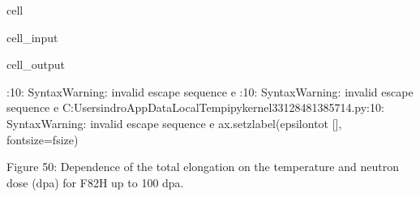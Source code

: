 \documentclass[letterpaper,10pt,english]{jupyterBook}
\begin{document}
\begin{sphinxuseclass}{cell}
\begin{sphinxVerbatimInput}
\begin{sphinxuseclass}{cell_input}
\begin{sphinxVerbatim}[commandchars=\\\{\}]
					 
					 
					\PYG{l+s+s1}{\PYGZdl{} [}\PYG{l+s+s1}{]} 
					 
				\end{sphinxVerbatim}
				
		\end{sphinxuseclass}\end{sphinxVerbatimInput}
		\begin{sphinxVerbatimOutput}
			
			\begin{sphinxuseclass}{cell_output}
				\begin{sphinxVerbatim}[commandchars=\\\{\}]
					\PYGZlt{}\PYGZgt{}:10: SyntaxWarning: invalid escape sequence \PYGZsq{}\PYGZbs{}e\PYGZsq{}
					\PYGZlt{}\PYGZgt{}:10: SyntaxWarning: invalid escape sequence \PYGZsq{}\PYGZbs{}e\PYGZsq{}
					C:\PYGZbs{}Users\PYGZbs{}indro\PYGZbs{}AppData\PYGZbs{}Local\PYGZbs{}Temp\PYGZbs{}ipykernel\PYGZus{}33128\PYGZbs{}481385714.py:10: SyntaxWarning: invalid escape sequence \PYGZsq{}\PYGZbs{}e\PYGZsq{}
					ax.set\PYGZus{}zlabel(\PYGZsq{}\PYGZdl{}\PYGZbs{}epsilon\PYGZus{}\PYGZob{}tot\PYGZcb{}\PYGZdl{} [\PYGZpc{}]\PYGZsq{}, fontsize=f\PYGZus{}size)
				\end{sphinxVerbatim}
				
				\noindent{}
				
		\end{sphinxuseclass}\end{sphinxVerbatimOutput}
		
	\end{sphinxuseclass}
	\sphinxAtStartPar
	Figure 50: Dependence of the total elongation on the temperature and neutron dose (dpa) for F82H up to 100 dpa.
	
\end{document}
